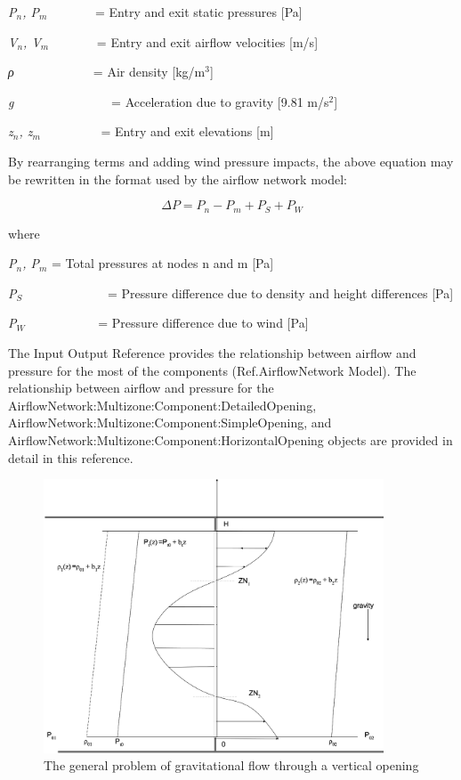 \emph{P\(_{n}\), P\(_{m}\)}~~~~~~~ = Entry and exit static pressures {[}Pa{]}

\emph{V\(_{n}\), V\(_{m}\)}~~~~~~~ = Entry and exit airflow velocities {[}m/s{]}

\emph{ρ~~~}~~~~~~~~~ = Air density {[}kg/m\(^{3}\){]}

\emph{g}~~~~~~~~~~~~~~~ = Acceleration due to gravity {[}9.81 m/s\(^{2}\){]}

\emph{z\(_{n}\), z\(_{m}\)}~~~~~~~~~ = Entry and exit elevations {[}m{]}

By rearranging terms and adding wind pressure impacts, the above equation may be rewritten in the format used by the airflow network model:

\begin{equation}
\Delta P = {P_n} - {P_m} + {P_S} + {P_W}
\end{equation}

where

\emph{P\(_{n}\), P\(_{m}\)} = Total pressures at nodes n and m {[}Pa{]}

\emph{P\(_{S}\)}~~~~~~~~~~~~~ = Pressure difference due to density and height differences {[}Pa{]}

\emph{P\(_{W}\)}~~~~~~~~~~~ = Pressure difference due to wind {[}Pa{]}

The Input Output Reference provides the relationship between airflow and pressure for the most of the components (Ref.AirflowNetwork Model). The relationship between airflow and pressure for the AirflowNetwork:Multizone:Component:DetailedOpening, AirflowNetwork:Multizone:Component:SimpleOpening, and \\ AirflowNetwork:Multizone:Component:HorizontalOpening objects are provided in detail in this reference.

\begin{figure}[hbtp] %
\centering
\includegraphics[width=0.9\textwidth, height=0.9\textheight, keepaspectratio=true]{media/image2691.svg.png}
\caption{The general problem of gravitational flow through a vertical opening \protect \label{fig:the-general-problem-of-gravitational-flow}}
\end{figure}

